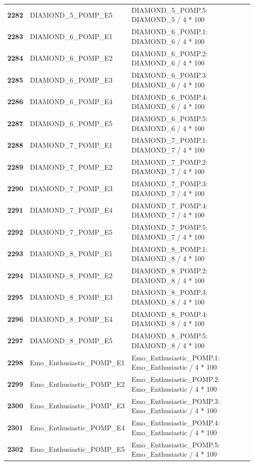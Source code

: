 \documentclass[
  letterpaper,
  DIV=11,
  numbers=noendperiod]{scrartcl}
\begin{document}
\begin{longtable}[t]{>{}cll}
\textbf{2282} & DIAMOND\_5\_POMP\_E5 & DIAMOND\_5\_POMP.5: DIAMOND\_5 / 4 * 100\\
\textbf{2283} & DIAMOND\_6\_POMP\_E1 & DIAMOND\_6\_POMP.1: DIAMOND\_6 / 4 * 100\\
\textbf{2284} & DIAMOND\_6\_POMP\_E2 & DIAMOND\_6\_POMP.2: DIAMOND\_6 / 4 * 100\\
\textbf{2285} & DIAMOND\_6\_POMP\_E3 & DIAMOND\_6\_POMP.3: DIAMOND\_6 / 4 * 100\\
\addlinespace
\textbf{2286} & DIAMOND\_6\_POMP\_E4 & DIAMOND\_6\_POMP.4: DIAMOND\_6 / 4 * 100\\
\textbf{2287} & DIAMOND\_6\_POMP\_E5 & DIAMOND\_6\_POMP.5: DIAMOND\_6 / 4 * 100\\
\textbf{2288} & DIAMOND\_7\_POMP\_E1 & DIAMOND\_7\_POMP.1: DIAMOND\_7 / 4 * 100\\
\textbf{2289} & DIAMOND\_7\_POMP\_E2 & DIAMOND\_7\_POMP.2: DIAMOND\_7 / 4 * 100\\
\textbf{2290} & DIAMOND\_7\_POMP\_E3 & DIAMOND\_7\_POMP.3: DIAMOND\_7 / 4 * 100\\
\addlinespace
\textbf{2291} & DIAMOND\_7\_POMP\_E4 & DIAMOND\_7\_POMP.4: DIAMOND\_7 / 4 * 100\\
\textbf{2292} & DIAMOND\_7\_POMP\_E5 & DIAMOND\_7\_POMP.5: DIAMOND\_7 / 4 * 100\\
\textbf{2293} & DIAMOND\_8\_POMP\_E1 & DIAMOND\_8\_POMP.1: DIAMOND\_8 / 4 * 100\\
\textbf{2294} & DIAMOND\_8\_POMP\_E2 & DIAMOND\_8\_POMP.2: DIAMOND\_8 / 4 * 100\\
\textbf{2295} & DIAMOND\_8\_POMP\_E3 & DIAMOND\_8\_POMP.3: DIAMOND\_8 / 4 * 100\\
\addlinespace
\textbf{2296} & DIAMOND\_8\_POMP\_E4 & DIAMOND\_8\_POMP.4: DIAMOND\_8 / 4 * 100\\
\textbf{2297} & DIAMOND\_8\_POMP\_E5 & DIAMOND\_8\_POMP.5: DIAMOND\_8 / 4 * 100\\
\textbf{2298} & Emo\_Enthusiastic\_POMP\_E1 & Emo\_Enthusiastic\_POMP.1: Emo\_Enthusiastic / 4 * 100\\
\textbf{2299} & Emo\_Enthusiastic\_POMP\_E2 & Emo\_Enthusiastic\_POMP.2: Emo\_Enthusiastic / 4 * 100\\
\textbf{2300} & Emo\_Enthusiastic\_POMP\_E3 & Emo\_Enthusiastic\_POMP.3: Emo\_Enthusiastic / 4 * 100\\
\addlinespace
\textbf{2301} & Emo\_Enthusiastic\_POMP\_E4 & Emo\_Enthusiastic\_POMP.4: Emo\_Enthusiastic / 4 * 100\\
\textbf{2302} & Emo\_Enthusiastic\_POMP\_E5 & Emo\_Enthusiastic\_POMP.5: Emo\_Enthusiastic / 4 * 100\\

\end{longtable}
\end{document}
